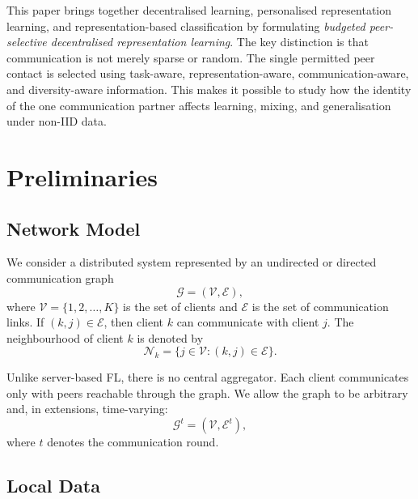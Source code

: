 \documentclass[conference]{IEEEtran}
\begin{document}
This paper brings together decentralised learning, personalised representation learning, and representation-based classification by formulating \emph{budgeted peer-selective decentralised representation learning}. The key distinction is that communication is not merely sparse or random. The single permitted peer contact is selected using task-aware, representation-aware, communication-aware, and diversity-aware information. This makes it possible to study how the identity of the one communication partner affects learning, mixing, and generalisation under non-IID data.

\section{Preliminaries}
\label{sec:preliminaries}

\subsection{Network Model}
\label{subsec:network-model}

We consider a distributed system represented by an undirected or directed communication graph
\begin{equation}
    \mathcal{G} = (\mathcal{V}, \mathcal{E}),
    \label{eq:auto-001}
\end{equation}
where \(\mathcal{V}=\{1,2,\dots,K\}\) is the set of clients and \(\mathcal{E}\) is the set of communication links. If \((k,j)\in\mathcal{E}\), then client \(k\) can communicate with client \(j\). The neighbourhood of client \(k\) is denoted by
\begin{equation}
    \mathcal{N}_k = \{j \in \mathcal{V}: (k,j)\in\mathcal{E}\}.
    \label{eq:auto-002}
\end{equation}

Unlike server-based FL, there is no central aggregator. Each client communicates only with peers reachable through the graph. We allow the graph to be arbitrary and, in extensions, time-varying:
\begin{equation}
    \mathcal{G}^t = (\mathcal{V}, \mathcal{E}^t),
    \label{eq:auto-003}
\end{equation}
where \(t\) denotes the communication round.

\subsection{Local Data}
\label{subsec:local-data}
\end{document}
